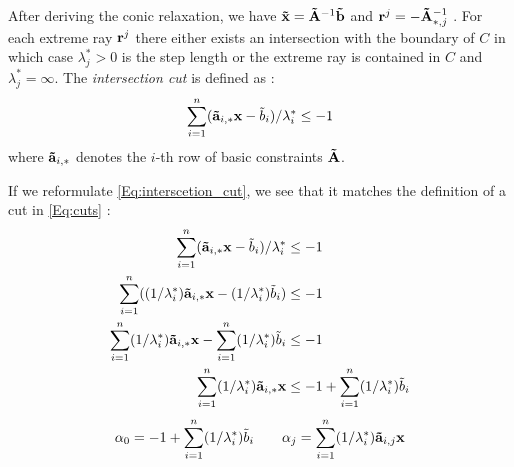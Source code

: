 After deriving the conic relaxation, we have $\bold{\tilde x} = \bold{\tilde A}^{-1} \bold{\tilde b}$ and $\bold r^j= - \bold{\tilde A}^{-1}_{*,j}$ \cite{bienstock_outer_product_free_sets}. For each extreme ray $\bold r^j$ there either exists an intersection with the boundary of $C$ in which case $\lambda^*_j > 0$ is the step length or the extreme ray is contained in $C$ and $\lambda^*_j= \infty$.
The \textit{intersection cut} is defined as \cite{bienstock_outer_product_free_sets}:
\begin{equation} \label{Eq:interscetion_cut}
    \sum_{i=1}^n (\bold{\tilde a}_{i,*} \bold x - \tilde b_i)/ \lambda_i^* \leq -1
\end{equation}
\quad where $\bold{\tilde a}_{i,*}$ denotes the $i$-th row of basic constraints $\bold{\tilde A}$.

\newpage
If we reformulate \cref{Eq:interscetion_cut}, we see that it matches the definition of a cut in \cref{Eq:cuts} \cite{bienstock_outer_product_free_sets}:
\begin{align}
    \sum_{i=1}^n (\bold{\tilde a}_{i,*} \bold x - \tilde b_i)/ \lambda_i^* &\leq -1 \\
    \sum_{i=1}^n ((1/ \lambda_i^*) \bold{\tilde a}_{i,*} \bold x - (1/ \lambda_i^*)\tilde b_i) &\leq -1 \\ 
    \sum_{i=1}^n (1/ \lambda_i^*) \bold{\tilde a}_{i,*} \bold x - \sum_{i=1}^n  (1/ \lambda_i^*)\tilde b_i &\leq -1 \\
    \sum_{i=1}^n (1/ \lambda_i^*) \bold{\tilde a}_{i,*} \bold x & \leq -1 + \sum_{i=1}^n  (1/ \lambda_i^*)\tilde b_i
\end{align}
\begin{equation*}
    \alpha_0 = -1 + \sum_{i=1}^n  (1/ \lambda_i^*)\tilde b_i \quad \quad \alpha_j = \sum_{i=1}^n (1/ \lambda_i^*) \bold{\tilde a}_{i,j} \bold x
\end{equation*}


